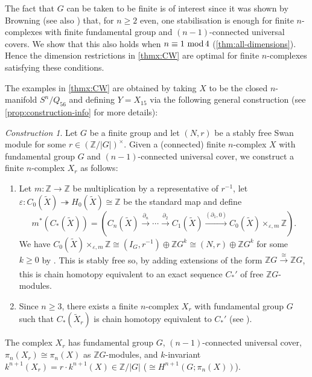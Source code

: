 \documentclass[11pt,leqno,a4paper]{amsart}
\newcommand{\Z}{\mathbb{Z}}
\renewcommand{\mod}{\,\,\text{\normalfont mod}\,}
\theoremstyle{definition}
\theoremstyle{remark}
\newtheorem{construction}[thm]{Construction}
\theoremstyle{custom}
\newenvironment{clist}[1]
{\begin{enumerate}[\normalfont #1]}
{\end{enumerate}}
\newcommand{\wt}{\widetilde}
\begin{document}
The fact that $G$ can be taken to be finite is of interest since it was shown by Browning \cite[Theorem 5.4]{Br78} (see also \cite[Corollary 4.7]{Ni20a}) that, for $n \ge 2$ even, one stabilisation is enough for finite $n$-complexes with finite fundamental group and $(n-1)$-connected universal covers. 
We show that this also holds when $n \equiv 1 \mod 4$ (\cref{thm:all-dimensions}). Hence the dimension restrictions in \cref{thmx:CW} are optimal for finite $n$-complexes satisfying these conditions. 

The examples in \cref{thmx:CW} are obtained by taking $X$ to be the closed $n$-manifold $S^n/Q_{56}$ and defining $Y = X_{15}$ via the following general construction (see \cref{prop:construction-info} for more details):

\begin{construction} \label{construction:Swan}
Let $G$ be a finite group and let $(N,r)$ be a stably free Swan module for some $r \in (\Z/|G|)^\times$. Given a (connected) finite $n$-complex $X$ with fundamental group $G$ and $(n-1)$-connected universal cover, we construct a finite $n$-complex $X_r$ as follows:
\begin{clist}{\hspace{4mm}1.}
\item
Let $m : \Z \to \Z$ be multiplication by a representative of $r^{-1}$, let $\varepsilon : C_0(\wt X) \twoheadrightarrow H_0(\wt X) \cong \Z$ be the standard map and define
\[ m^*(C_*(\wt X)) = (C_n(\wt X) \xrightarrow{\partial_n} \cdots \xrightarrow{\partial_2} C_1(\wt X) \xrightarrow{(\partial_1,0)} C_0(\wt X) \times_{\varepsilon,m} \Z). \]
We have $C_0(\wt X) \times_{\varepsilon,m} \Z \cong (I_G,r^{-1}) \oplus \Z G^k \cong (N,r) \oplus \Z G^k$ for some $k \ge 0$ by \cite[Proposition 3.4 \& Lemma 4.12]{Ni20a}.
This is stably free so, by adding extensions of the form $\Z G \xrightarrow[]{\cong} \Z G$, this is chain homotopy equivalent to an exact sequence $C_*'$ of free $\Z G$-modules.
\item
Since $n \ge 3$, there exists a finite $n$-complex $X_r$ with fundamental group $G$ such that $C_*(\wt X_r)$ is chain homotopy equivalent to $C_*'$ (see \cite[Corollary 8.27]{Jo12a}).
\end{clist}
The complex $X_r$ has fundamental group $G$, $(n-1)$-connected universal cover, $\pi_n(X_r) \cong \pi_n(X)$ as $\Z G$-modules, and $k$-invariant $k^{n+1}(X_r) = r \cdot k^{n+1}(X) \in \Z/|G|$ ($\cong H^{n+1}(G;\pi_n(X))$).
\end{construction}
\end{document}
